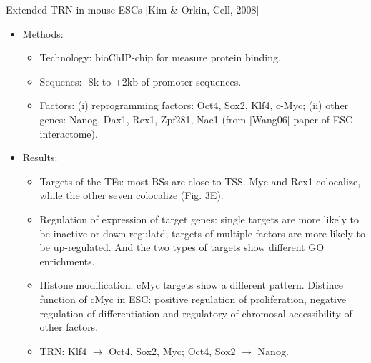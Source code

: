 \documentclass{report}
\begin{document}
Extended TRN in mouse ESCs [Kim \& Orkin, Cell, 2008]
\begin{itemize}
	\item Methods: 
	\begin{itemize}
		\item Technology: bioChIP-chip for measure protein binding. 
		\item Sequenes: -8k to +2kb of promoter sequences. 
		\item Factors: (i) reprogramming factors: Oct4, Sox2, Klf4, c-Myc; (ii) other genes: Nanog, Dax1, Rex1, Zpf281, Nac1 (from [Wang06] paper of ESC interactome). 
	\end{itemize}
	
	\item Results: 
	\begin{itemize}
		\item Targets of the TFs: most BSs are close to TSS. Myc and Rex1 colocalize, while the other seven colocalize (Fig. 3E). 
		\item Regulation of expression of target genes: single targets are more likely to be inactive or down-regulatd; targets of multiple factors are more likely to be up-regulated. And the two types of targets show different GO enrichments. 
		\item Histone modification: cMyc targets show a different pattern. Distince function of cMyc in ESC: positive regulation of proliferation, negative regulation of differentiation and regulatory of chromosal accessibility of other factors. 
		\item TRN: Klf4 $\rightarrow$ Oct4, Sox2, Myc; Oct4, Sox2 $\rightarrow$ Nanog. 
	\end{itemize}
\end{itemize}
	
\end{document}
